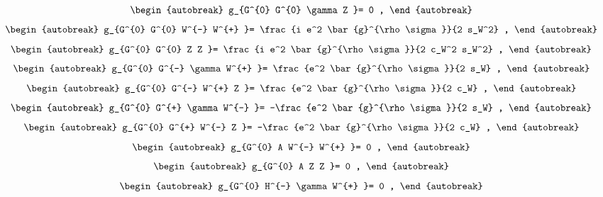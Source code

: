 \begin{align}
\begin{autobreak}
g_{G^{0} G^{0} \gamma Z }=
	0
	,
\end{autobreak}
\end{align}
\begin{align}
\begin{autobreak}
g_{G^{0} G^{0} W^{-} W^{+} }=
	\frac{i e^2 \bar{g}^{\rho \sigma }}{2 s_W^2}
	,
\end{autobreak}
\end{align}
\begin{align}
\begin{autobreak}
g_{G^{0} G^{0} Z Z }=
	\frac{i e^2 \bar{g}^{\rho \sigma }}{2 c_W^2 s_W^2}
	,
\end{autobreak}
\end{align}
\begin{align}
\begin{autobreak}
g_{G^{0} G^{-} \gamma W^{+} }=
	\frac{e^2 \bar{g}^{\rho \sigma }}{2 s_W}
	,
\end{autobreak}
\end{align}
\begin{align}
\begin{autobreak}
g_{G^{0} G^{-} W^{+} Z }=
	\frac{e^2 \bar{g}^{\rho \sigma }}{2 c_W}
	,
\end{autobreak}
\end{align}
\begin{align}
\begin{autobreak}
g_{G^{0} G^{+} \gamma W^{-} }=
	-\frac{e^2 \bar{g}^{\rho \sigma }}{2 s_W}
	,
\end{autobreak}
\end{align}
\begin{align}
\begin{autobreak}
g_{G^{0} G^{+} W^{-} Z }=
	-\frac{e^2 \bar{g}^{\rho \sigma }}{2 c_W}
	,
\end{autobreak}
\end{align}
\begin{align}
\begin{autobreak}
g_{G^{0} A W^{-} W^{+} }=
	0
	,
\end{autobreak}
\end{align}
\begin{align}
\begin{autobreak}
g_{G^{0} A Z Z }=
	0
	,
\end{autobreak}
\end{align}
\begin{align}
\begin{autobreak}
g_{G^{0} H^{-} \gamma W^{+} }=
	0
	,
\end{autobreak}
\end{align}
